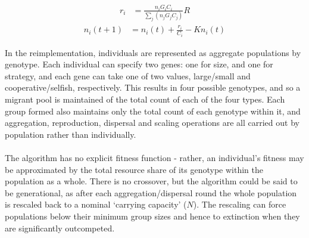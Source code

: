 \documentclass[11pt]{article}
\begin{document}
\begin{align} \label{eq:desire}
  r_i &= \frac{n_iG_iC_i}{\sum\limits_{j}(n_jG_jC_j)}R
\end{align}
\begin{align} \label{eq:shares}
  n_i(t+1) &= n_i(t) + \frac{r_i}{C_i} - Kn_i(t)
\end{align}

In the reimplementation, individuals are represented as aggregate populations by genotype. Each individual can specify two genes: one for size, and one for strategy, and each gene can take one of two values, large/small and cooperative/selfish, respectively. This results in four possible genotypes, and so a migrant pool is maintained of the total count of each of the four types. Each group formed also maintains only the total count of each genotype within it, and aggregation, reproduction, dispersal and scaling operations are all carried out by population rather than individually.\\
\\
The algorithm has no explicit fitness function - rather, an individual's fitness may be approximated by the total resource share of its genotype within the population as a whole. There is no crossover, but the algorithm could be said to be generational, as after each aggregation/dispersal round the whole population is rescaled back to a nominal `carrying capacity' ($N$). The rescaling can force populations below their minimum group sizes and hence to extinction when they are significantly outcompeted.\\
\newpage
\end{document}

